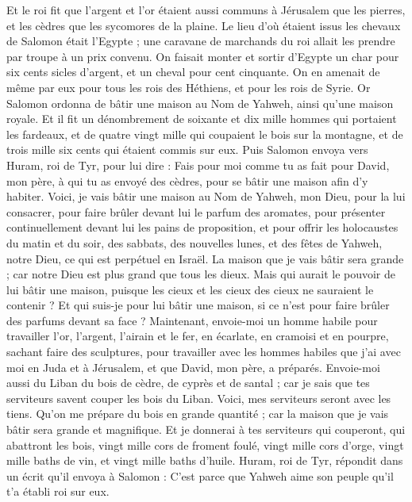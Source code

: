 \begin{multicols}{2}
Et le roi fit que l'argent et l'or étaient aussi communs à Jérusalem que les pierres, et les cèdres que les sycomores de la plaine.
Le lieu d'où étaient issus les chevaux de Salomon était l'Egypte ; une caravane de marchands du roi allait les prendre par troupe à un prix convenu.
On faisait monter et sortir d'Egypte un char pour six cents sicles d'argent, et un cheval pour cent cinquante. On en amenait de même par eux pour tous les rois des Héthiens, et pour les rois de Syrie.
\VerseOne{}Or Salomon ordonna de bâtir une maison au Nom de Yahweh, ainsi qu'une maison royale.
Et il fit un dénombrement de soixante et dix mille hommes qui portaient les fardeaux, et de quatre vingt mille qui coupaient le bois sur la montagne, et de trois mille six cents qui étaient commis sur eux.
Puis Salomon envoya vers Huram, roi de Tyr, pour lui dire : Fais pour moi comme tu as fait pour David, mon père, à qui tu as envoyé des cèdres, pour se bâtir une maison afin d'y habiter.
Voici, je vais bâtir une maison au Nom de Yahweh, mon Dieu, pour la lui consacrer, pour faire brûler devant lui le parfum des aromates, pour présenter continuellement devant lui les pains de proposition, et pour offrir les holocaustes du matin et du soir, des sabbats, des nouvelles lunes, et des fêtes de Yahweh, notre Dieu, ce qui est perpétuel en Israël.
La maison que je vais bâtir sera grande ; car notre Dieu est plus grand que tous les dieux.
Mais qui aurait le pouvoir de lui bâtir une maison, puisque les cieux et les cieux des cieux ne sauraient le contenir ? Et qui suis-je pour lui bâtir une maison, si ce n'est pour faire brûler des parfums devant sa face ?
Maintenant, envoie-moi un homme habile pour travailler l'or, l'argent, l'airain et le fer, en écarlate, en cramoisi et en pourpre, sachant faire des sculptures, pour travailler avec les hommes habiles que j'ai avec moi en Juda et à Jérusalem, et que David, mon père, a préparés.
Envoie-moi aussi du Liban du bois de cèdre, de cyprès et de santal ; car je sais que tes serviteurs savent couper les bois du Liban. Voici, mes serviteurs seront avec les tiens.
Qu'on me prépare du bois en grande quantité ; car la maison que je vais bâtir sera grande et magnifique.
Et je donnerai à tes serviteurs qui couperont, qui abattront les bois, vingt mille cors de froment foulé, vingt mille cors d'orge, vingt mille baths de vin, et vingt mille baths d'huile.
Huram, roi de Tyr, répondit dans un écrit qu'il envoya à Salomon : C'est parce que Yahweh aime son peuple qu'il t'a établi roi sur eux.

\end{multicols}
